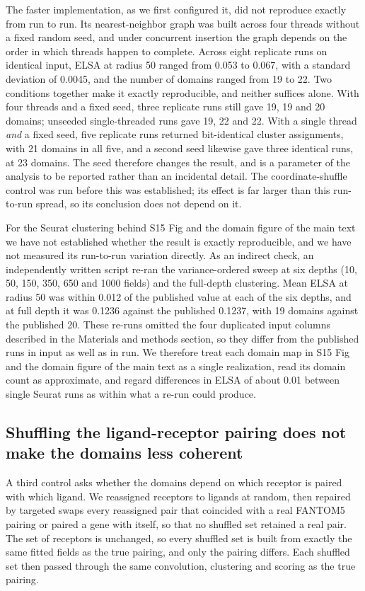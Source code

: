 \documentclass[10pt]{article}
\begin{document}
The faster implementation, as we first configured it, did not reproduce exactly from run to run. Its nearest-neighbor graph was built across four threads without a fixed random seed, and under concurrent insertion the graph depends on the order in which threads happen to complete. Across eight replicate runs on identical input, ELSA at radius 50 ranged from 0.053 to 0.067, with a standard deviation of 0.0045, and the number of domains ranged from 19 to 22. Two conditions together make it exactly reproducible, and neither suffices alone. With four threads and a fixed seed, three replicate runs still gave 19, 19 and 20 domains; unseeded single-threaded runs gave 19, 22 and 22. With a single thread \textit{and} a fixed seed, five replicate runs returned bit-identical cluster assignments, with 21 domains in all five, and a second seed likewise gave three identical runs, at 23 domains. The seed therefore changes the result, and is a parameter of the analysis to be reported rather than an incidental detail. The coordinate-shuffle control was run before this was established; its effect is far larger than this run-to-run spread, so its conclusion does not depend on it.

For the Seurat clustering behind S15 Fig and the domain figure of the main text we have not established whether the result is exactly reproducible, and we have not measured its run-to-run variation directly. As an indirect check, an independently written script re-ran the variance-ordered sweep at six depths (10, 50, 150, 350, 650 and 1000 fields) and the full-depth clustering. Mean ELSA at radius 50 was within 0.012 of the published value at each of the six depths, and at full depth it was 0.1236 against the published 0.1237, with 19 domains against the published 20. These re-runs omitted the four duplicated input columns described in the Materials and methods section, so they differ from the published runs in input as well as in run. We therefore treat each domain map in S15 Fig and the domain figure of the main text as a single realization, read its domain count as approximate, and regard differences in ELSA of about 0.01 between single Seurat runs as within what a re-run could produce.

\subsection*{Shuffling the ligand-receptor pairing does not make the domains less coherent}

A third control asks whether the domains depend on which receptor is paired with which ligand. We reassigned receptors to ligands at random, then repaired by targeted swaps every reassigned pair that coincided with a real FANTOM5 pairing or paired a gene with itself, so that no shuffled set retained a real pair. The set of receptors is unchanged, so every shuffled set is built from exactly the same fitted fields as the true pairing, and only the pairing differs. Each shuffled set then passed through the same convolution, clustering and scoring as the true pairing.
\end{document}
